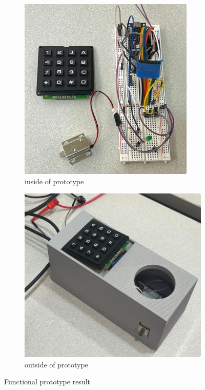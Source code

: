\begin{figure}[!ht]
\centering
\begin{subfigure}{.5\textwidth}
  \centering
  \includegraphics[width=.7\linewidth]{img/prototypeInside.png}
  \caption{inside of prototype}
  \label{fig:prototypeInside}
\end{subfigure}%
\begin{subfigure}{.5\textwidth}
  \centering
  \includegraphics[width=.7\linewidth]{img/prototypeOutside.png}
  \caption{outside of prototype}
  \label{fig:prototypeOutside}
\end{subfigure}
\caption{Functional prototype result}
\label{fig:test}
\end{figure}